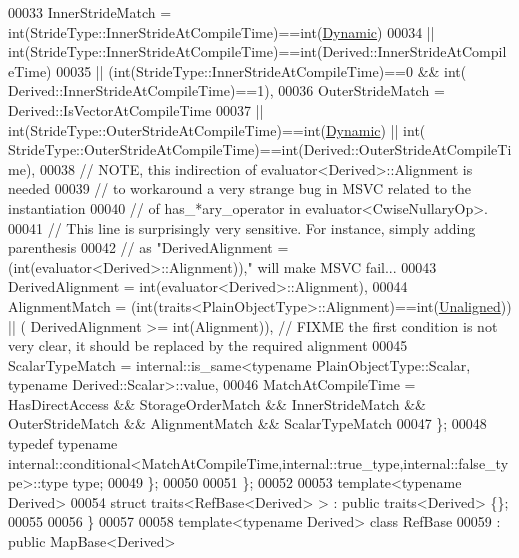 \begin{DoxyCode}
00033       InnerStrideMatch = \textcolor{keywordtype}{int}(StrideType::InnerStrideAtCompileTime)==int(\hyperlink{namespace_eigen_ad81fa7195215a0ce30017dfac309f0b2}{Dynamic})
00034                       || int(StrideType::InnerStrideAtCompileTime)==int(Derived::InnerStrideAtCompileTime)
00035                       || (int(StrideType::InnerStrideAtCompileTime)==0 && int(
      Derived::InnerStrideAtCompileTime)==1),
00036       OuterStrideMatch = Derived::IsVectorAtCompileTime
00037                       || \textcolor{keywordtype}{int}(StrideType::OuterStrideAtCompileTime)==int(\hyperlink{namespace_eigen_ad81fa7195215a0ce30017dfac309f0b2}{Dynamic}) || int(
      StrideType::OuterStrideAtCompileTime)==int(Derived::OuterStrideAtCompileTime),
00038       \textcolor{comment}{// NOTE, this indirection of evaluator<Derived>::Alignment is needed}
00039       \textcolor{comment}{// to workaround a very strange bug in MSVC related to the instantiation}
00040       \textcolor{comment}{// of has\_*ary\_operator in evaluator<CwiseNullaryOp>.}
00041       \textcolor{comment}{// This line is surprisingly very sensitive. For instance, simply adding parenthesis}
00042       \textcolor{comment}{// as "DerivedAlignment = (int(evaluator<Derived>::Alignment))," will make MSVC fail...}
00043       DerivedAlignment = int(evaluator<Derived>::Alignment),
00044       AlignmentMatch = (int(traits<PlainObjectType>::Alignment)==int(\hyperlink{group__enums_gga45fe06e29902b7a2773de05ba27b47a1ac935220b4c844108e183ebe30a4d5204}{Unaligned})) || (
      DerivedAlignment >= \textcolor{keywordtype}{int}(Alignment)), \textcolor{comment}{// FIXME the first condition is not very clear, it should be replaced by the
       required alignment}
00045       ScalarTypeMatch = internal::is\_same<typename PlainObjectType::Scalar, typename
       Derived::Scalar>::value,
00046       MatchAtCompileTime = HasDirectAccess && StorageOrderMatch && InnerStrideMatch && OuterStrideMatch && 
      AlignmentMatch && ScalarTypeMatch
00047     \};
00048     \textcolor{keyword}{typedef} \textcolor{keyword}{typename} 
      internal::conditional<MatchAtCompileTime,internal::true\_type,internal::false\_type>::type type;
00049   \};
00050   
00051 \};
00052 
00053 \textcolor{keyword}{template}<\textcolor{keyword}{typename} Derived>
00054 \textcolor{keyword}{struct }traits<RefBase<Derived> > : \textcolor{keyword}{public} traits<Derived> \{\};
00055 
00056 \}
00057 
00058 \textcolor{keyword}{template}<\textcolor{keyword}{typename} Derived> \textcolor{keyword}{class }RefBase
00059  : \textcolor{keyword}{public} MapBase<Derived>

\end{DoxyCode}
